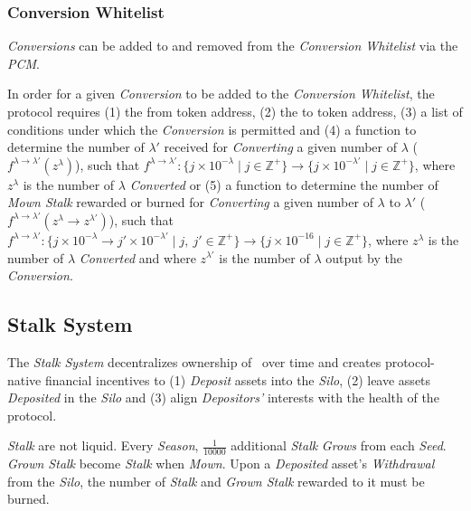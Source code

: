 \documentclass[tikz]{article}
\newcommand{\term}[1]{\textsl{#1}}
\newcommand{\Pinto}{} %
\begin{document}

\subsubsection{Conversion Whitelist}

\term{Conversions} can be added to and removed from the \term{Conversion Whitelist} via the \term{PCM}.

In order for a given \term{Conversion} to be added to the \term{Conversion Whitelist}, the protocol requires 
(1) the from token address, 
(2) the to token address, 
(3) a list of conditions under which the \term{Conversion} is permitted and 
(4) a function to determine the number of $\lambda'$ received for \term{Converting} a given number of $\lambda$ ($f^{\lambda \rightarrow \lambda'}(z^{\lambda})$), such that $f^{\lambda \rightarrow \lambda'}\colon \{j \times 10^{-\lambda} \mid j \in \mathbb{Z}^{+} \} \rightarrow \{j \times 10^{-\lambda'} \mid j \in \mathbb{Z}^{+} \}$, where $z^{\lambda}$ is the number of $\lambda$ \term{Converted} or 
(5) a function to determine the number of \term{Mown Stalk} rewarded or burned for \term{Converting} a given number of $\lambda$ to $\lambda'$ ($f^{\lambda \rightarrow \lambda'}(z^{\lambda} \rightarrow z^{\lambda'})$), such that $f^{\lambda \rightarrow \lambda'}\colon \{j \times 10^{-\lambda} \rightarrow j' \times 10^{-\lambda'} \mid j,\ j' \in \mathbb{Z}^{+} \} \rightarrow \{j \times 10^{-16} \mid j \in \mathbb{Z}^{+} \}$, where $z^{\lambda}$ is the number of $\lambda$ \term{Converted} and where $z^{\lambda'}$ is the number of $\lambda$ output by the \term{Conversion}. 


\vspace*{-1.35mm}
\subsection{Stalk System}
\vspace*{-1.35mm}

The \term{Stalk System} decentralizes ownership of \Pinto\ over time and creates protocol-native financial incentives to (1) \term{Deposit} assets into the \term{Silo}, (2) leave assets \term{Deposited} in the \term{Silo} and (3) align \term{Depositors'} interests with the health of the protocol.

\term{Stalk} are not liquid. Every \term{Season}, $\frac{1}{10000}$ additional \term{Stalk} \term{Grows} from each \term{Seed}. \term{Grown Stalk} become \term{Stalk} when \term{Mown}. Upon a \term{Deposited} asset's \term{Withdrawal} from the \term{Silo}, the number of \term{Stalk} and \term{Grown Stalk} rewarded to it must be burned.
\end{document}
